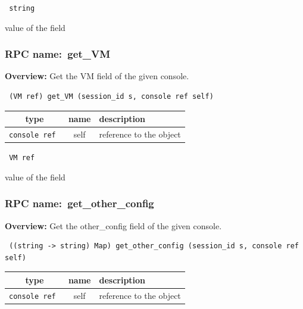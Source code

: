 \vspace{0.3cm}

{\tt 
string
}


value of the field
\vspace{0.3cm}
\vspace{0.3cm}
\vspace{0.3cm}
\subsubsection{RPC name:~get\_VM}

{\bf Overview:} 
Get the VM field of the given console.

\begin{verbatim} (VM ref) get_VM (session_id s, console ref self)\end{verbatim}



 
\vspace{0.3cm}
\begin{tabular}{|c|c|p{7cm}|}
 \hline
{\bf type} & {\bf name} & {\bf description} \\ \hline
{\tt console ref } & self & reference to the object \\ \hline 

\end{tabular}

\vspace{0.3cm}

{\tt 
VM ref
}


value of the field
\vspace{0.3cm}
\vspace{0.3cm}
\vspace{0.3cm}
\subsubsection{RPC name:~get\_other\_config}

{\bf Overview:} 
Get the other\_config field of the given console.

\begin{verbatim} ((string -> string) Map) get_other_config (session_id s, console ref self)\end{verbatim}



 
\vspace{0.3cm}
\begin{tabular}{|c|c|p{7cm}|}
 \hline
{\bf type} & {\bf name} & {\bf description} \\ \hline
{\tt console ref } & self & reference to the object \\ \hline 

\end{tabular}

